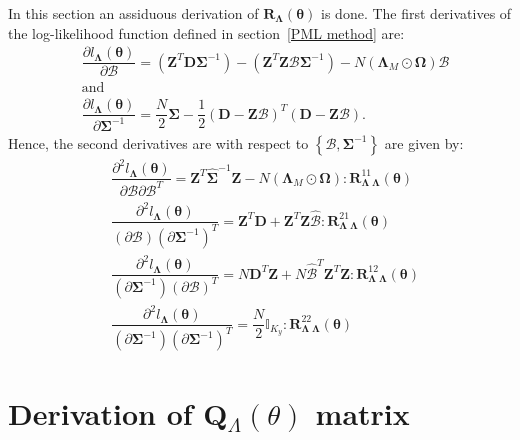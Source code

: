 In this section an assiduous derivation of $\bm{R}_{\bm{\Lambda}}(\bm{\theta})$ is done. The first derivatives of the log-likelihood function defined in section~\ref{PML method} are:
\begin{align}
& \dfrac{\partial l_{\bm{\Lambda}}(\bm{\theta})}{\partial \bm{\mathcal{B}}} = \left(\bm{Z}^T \bm{D} \bm{\Sigma}^{-1} \right) - \left(\bm{Z}^T\bm{Z} \bm{\mathcal{B}}\bm{\Sigma}^{-1} \right) - N \left(\bm{\Lambda}_M \odot \bm{\Omega} \right) \bm{\mathcal{B}} \nonumber \\
& \text{and} \nonumber \\
& \dfrac{\partial l_{\bm{\Lambda}}(\bm{\theta})}{\partial \bm{\Sigma}^{-1}} = \dfrac{N}{2}\bm{\Sigma}-\dfrac{1}{2}\left(\bm{D} - \bm{Z} \bm{\mathcal{B}}\right)^T \left(\bm{D} - \bm{Z} \bm{\mathcal{B}}\right). \nonumber
\end{align}
Hence, the second derivatives are with respect to $\left\{\bm{\mathcal{B}},\bm{\Sigma}^{-1}\right\}$ are given by:
\begin{align}
& \dfrac{\partial^2 l_{\bm{\Lambda}}(\bm{\theta})}{\partial \bm{\mathcal{B}} \partial \bm{\mathcal{B}}^T} = \bm{Z}^T \hat{\bm{\Sigma}}^{-1} \bm{Z} - N \left(\bm{\Lambda}_M \odot \bm{\Omega} \right) : \bm{R}_{\bm{\Lambda}}^{11}_{\bm{\Lambda}}(\bm{\theta}) \nonumber \\
& \dfrac{\partial^2 l_{\bm{\Lambda}}(\bm{\theta})}{(\partial \bm{\mathcal{B}}) (\partial \bm{\Sigma}^{-1})^{T}} = \bm{Z}^T\bm{D} + \bm{Z}^T\bm{Z}\hat{\bm{\mathcal{B}}} : \bm{R}_{\bm{\Lambda}}^{21}_{\bm{\Lambda}}(\bm{\theta}) \nonumber \\
& \dfrac{\partial^2 l_{\bm{\Lambda}}(\bm{\theta})}{(\partial \bm{\Sigma}^{-1})(\partial \bm{\mathcal{B}})^{T}} = N \bm{D}^T\bm{Z} + N \hat{\bm{\mathcal{B}}}^T \bm{Z}^T\bm{Z} : \bm{R}_{\bm{\Lambda}}^{12}_{\bm{\Lambda}}(\bm{\theta}) \nonumber \\
& \dfrac{\partial^2 l_{\bm{\Lambda}}(\bm{\theta})}{(\partial \bm{\Sigma}^{-1})(\partial \bm{\Sigma}^{-1})^{T}} = \dfrac{N}{2} \mathbb{I}_{K_y} : \bm{R}_{\bm{\Lambda}}^{22}_{\bm{\Lambda}}(\bm{\theta}) \nonumber
\end{align}

\section{Derivation of \textbf{Q}${}_{\Lambda}(\theta)$ matrix}

